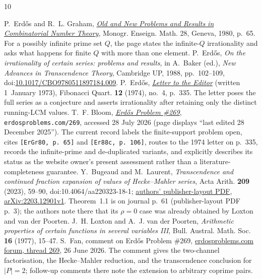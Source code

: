 \documentclass[11pt]{article}
\begin{document}
\begin{thebibliography}{10}
\small\raggedright
\setlength{\itemsep}{0pt}
 P.~Erd\H{o}s and R.~L. Graham,
  \href{https://mathweb.ucsd.edu/~ronspubs/80_11_number_theory.pdf}{\emph{Old
  and New Problems and Results in Combinatorial Number Theory}},
  Monogr. Enseign. Math. 28, Geneva, 1980, p.~65.  For a possibly infinite
  prime set $Q$, the page states the infinite-$Q$ irrationality and asks what
  happens for finite $Q$ with more than one element.
 P.~Erd\H{o}s, \emph{On the irrationality of certain series:
  problems and results}, in A.~Baker (ed.), \emph{New Advances in Transcendence
  Theory}, Cambridge UP, 1988, pp.~102--109,
  doi:\href{https://doi.org/10.1017/CBO9780511897184.009}{10.1017/CBO9780511897184.009}.
 P.~Erd\H{o}s,
  \href{https://www.fq.math.ca/Scanned/12-4/letter.pdf}{\emph{Letter to the
  Editor}} (written 1~January 1973), Fibonacci Quart. \textbf{12} (1974),
  no.~4, p.~335.  The letter poses the full series as a conjecture and asserts
  irrationality after retaining only the distinct running-LCM values.
 T.~F. Bloom,
  \href{https://www.erdosproblems.com/269}{\emph{Erd\H{o}s Problem \#269}},
  \texttt{erdosproblems.com/269}, accessed 28 July 2026 (page displays
  ``last edited 28 December 2025'').  The current record labels the
  finite-support problem open, cites \texttt{[ErGr80, p.~65]} and
  \texttt{[Er88c, p.~106]}, routes to the 1974 letter on p.~335, records the
  infinite-prime and de-duplicated variants, and explicitly describes its
  status as the website owner's present assessment rather than a
  literature-completeness guarantee.
 Y.~Bugeaud and M.~Laurent,
  \emph{Transcendence and continued fraction expansion of values of
  Hecke--Mahler series}, Acta Arith. \textbf{209} (2023), 59--90,
  doi:10.4064/aa220323-18-1;
  \href{https://irma.math.unistra.fr/~bugeaud/travaux/BuMLAA.pdf}
  {authors' publisher-layout PDF},
  \href{https://arxiv.org/abs/2203.12901}{arXiv:2203.12901v1}.
  Theorem~1.1 is on journal p.~61 (publisher-layout PDF p.~3); the authors
  note there that its $\rho=0$ case was already obtained by Loxton and van
  der Poorten.
 J.~H. Loxton and A.~J. van der Poorten,
  \emph{Arithmetic properties of certain functions in several variables III},
  Bull. Austral. Math. Soc. \textbf{16} (1977), 15--47.
 S.~Fan, comment on Erd\H{o}s Problem \#269,
  \href{https://www.erdosproblems.com/forum/thread/269}
  {erdosproblems.com forum, thread 269}, 26 June 2026.  The comment gives the
  two-channel factorisation, the Hecke--Mahler reduction, and the
  transcendence conclusion for $|P|=2$; follow-up comments there note the
  extension to arbitrary coprime pairs.
\end{thebibliography}
\end{document}
